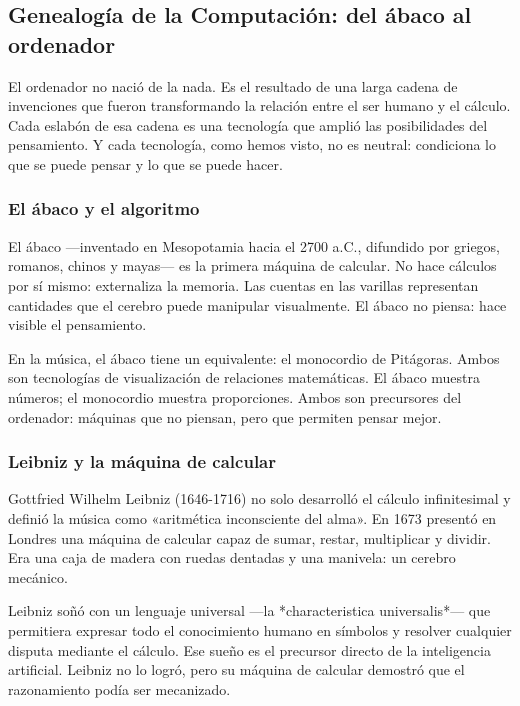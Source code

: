 \documentclass[14pt, a4paper]{article}
\begin{document}
\subsection{Genealogía de la Computación: del ábaco al ordenador}
\label{genealogia-computacion}
El ordenador no nació de la nada. Es el resultado de una larga cadena
de invenciones que fueron transformando la relación entre el ser
humano y el cálculo. Cada eslabón de esa cadena es una tecnología que
amplió las posibilidades del pensamiento. Y cada tecnología, como
hemos visto, no es neutral: condiciona lo que se puede pensar y lo que
se puede hacer.
\subsubsection{El ábaco y el algoritmo}
\label{abaco}
El ábaco —inventado en Mesopotamia hacia el 2700 a.C., difundido por
griegos, romanos, chinos y mayas— es la primera máquina de calcular.
No hace cálculos por sí mismo: externaliza la memoria. Las cuentas en
las varillas representan cantidades que el cerebro puede manipular
visualmente. El ábaco no piensa: hace visible el pensamiento.

En la música, el ábaco tiene un equivalente: el monocordio de
Pitágoras. Ambos son tecnologías de visualización de relaciones
matemáticas. El ábaco muestra números; el monocordio muestra
proporciones. Ambos son precursores del ordenador: máquinas que no
piensan, pero que permiten pensar mejor.
\subsubsection{Leibniz y la máquina de calcular}
\label{leibniz-maquina}
Gottfried Wilhelm Leibniz (1646-1716) no solo desarrolló el cálculo
infinitesimal y definió la música como «aritmética inconsciente del
alma». En 1673 presentó en Londres una máquina de calcular capaz de
sumar, restar, multiplicar y dividir. Era una caja de madera con
ruedas dentadas y una manivela: un cerebro mecánico.

Leibniz soñó con un lenguaje universal —la *characteristica
universalis*— que permitiera expresar todo el conocimiento humano en
símbolos y resolver cualquier disputa mediante el cálculo. Ese sueño
es el precursor directo de la inteligencia artificial. Leibniz no lo
logró, pero su máquina de calcular demostró que el razonamiento podía
ser mecanizado.
\end{document}
